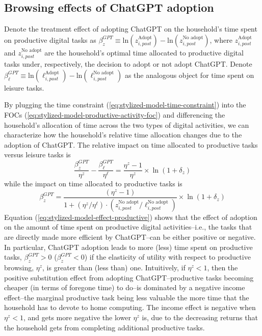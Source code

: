 \documentclass[12pt]{article}
\begin{document}
\subsection{Browsing effects of ChatGPT adoption}

Denote the treatment effect of adopting ChatGPT on the household's time spent on productive digital tasks as $\beta^{GPT}_{z} \equiv \text{ln}(z_{i,post}^{\text{Adopt}}) - \text{ln}(z_{i,post}^{\text{No adopt}})$, where $z_{i,post}^{\text{Adopt}}$ and $z_{i,post}^{\text{No adopt}}$ are the household's optimal time allocated to productive digital tasks under, respectively, the decision to adopt or not adopt ChatGPT. Denote $\beta^{GPT}_{\ell} \equiv \text{ln}(\ell_{i,post}^{\text{Adopt}}) - \text{ln}(\ell_{i,post}^{\text{No adopt}})$ as the analogous object for time spent on leisure tasks. 

By plugging the time constraint (\ref{eq:stylized-model-time-constraint}) into the FOCs (\ref{eq:stylized-model-productive-activity-foc}) and differencing the household's allocation of time across the two types of digital activities, we can characterize how the household's relative time allocation changes due to the adoption of ChatGPT. The relative impact on time allocated to productive tasks versus leisure tasks is 
\begin{equation}
\label{eq:stylized-model-effect-difference}
\frac{\beta^{GPT}_{z}}{\eta^z} - \frac{\beta^{GPT}_{\ell} }{\eta^{\ell}} = \frac{\eta^z - 1}{\eta^z} \times \ln(1+ \delta_z )
\end{equation}
while the impact on time allocated to productive tasks is
\begin{equation}
\label{eq:stylized-model-effect-productive}
\beta^{GPT}_{z} = \frac{(\eta^z - 1 )}{1 + \left(\eta^{z} / \eta^{\ell} \right)\cdot \left(z_{i,post}^{\text{No adopt}} / \ell_{i,post}^{\text{No adopt}}\right)}  \times  \ln(1+ \delta_z )
\end{equation}
Equation (\ref{eq:stylized-model-effect-productive}) shows that the effect of adoption on the amount of time spent on productive digital activities--i.e., the tasks that are directly made more efficient by ChatGPT--can be either positive or negative. In particular, ChatGPT adoption leads to more (less) time spent on productive tasks, $\beta_z^{GPT} > 0$ ($\beta_z^{GPT} < 0$) if the elasticity of utility with respect to productive browsing, $\eta^z$, is greater than (less than) one. Intuitively, if $\eta^z < 1$, then the positive substitution effect from adopting ChatGPT--productive tasks becoming cheaper (in terms of foregone time) to do--is dominated by a negative income effect--the marginal productive task being less valuable the more time that the household has to devote to home computing. The income effect is negative when $\eta^z < 1$, and gets more negative the lower $\eta^z$ is, due to the decreasing returns that the household gets from completing additional productive tasks. 
\end{document}

